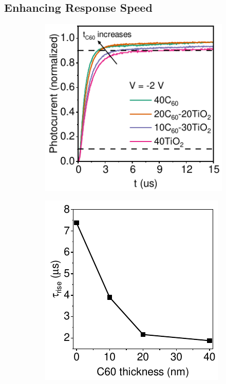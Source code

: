 \subsection{Enhancing Response Speed}

\begin{figure}[htbp]
    \centering
    \begin{subfigure}[t]{0.4\textwidth}
        \centering
        \includegraphics[width=\textwidth]{chapters/transport_layers/images/TPC_comparison_v2.pdf} %
        \caption{}
        \label{}
    \end{subfigure}
    \hspace{0.5cm}
    \begin{subfigure}[t]{0.37\textwidth}
        \centering
        \includegraphics[width=\textwidth]{chapters/transport_layers/images/Rise_time_f_c60_thickness.pdf} 

\end{subfigure}
\end{figure}
